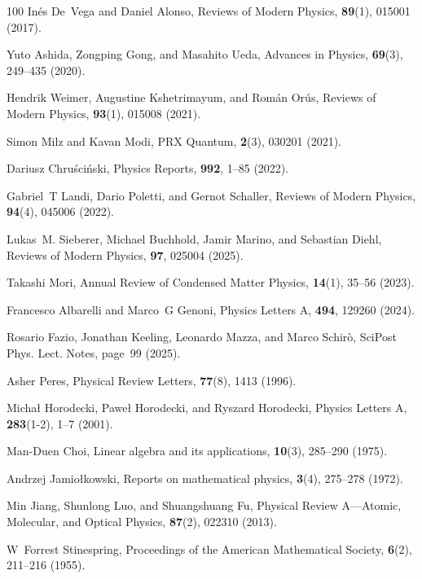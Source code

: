 \documentclass[preprint,pteplogo]{ptephy_v2}%
\numberwithin{equation}{section}
\theoremstyle{definition}
\begin{document}
\begin{thebibliography}{100}
In{\'e}s De~Vega and Daniel Alonso, Reviews of Modern Physics, {\bf 89}(1), 015001 (2017).

Yuto Ashida, Zongping Gong, and Masahito Ueda, Advances in Physics, {\bf 69}(3), 249--435 (2020).

Hendrik Weimer, Augustine Kshetrimayum, and Rom{\'a}n Or{\'u}s, Reviews of Modern Physics, {\bf 93}(1), 015008 (2021).

Simon Milz and Kavan Modi, PRX Quantum, {\bf 2}(3), 030201 (2021).

Dariusz Chru{\'s}ci{\'n}ski, Physics Reports, {\bf 992}, 1--85 (2022).

Gabriel~T Landi, Dario Poletti, and Gernot Schaller, Reviews of Modern Physics, {\bf 94}(4), 045006 (2022).

Lukas~M. Sieberer, Michael Buchhold, Jamir Marino, and Sebastian Diehl, Reviews of Modern Physics, {\bf 97}, 025004 (2025).

Takashi Mori, Annual Review of Condensed Matter Physics, {\bf 14}(1), 35--56 (2023).

Francesco Albarelli and Marco~G Genoni, Physics Letters A, {\bf 494}, 129260 (2024).

Rosario Fazio, Jonathan Keeling, Leonardo Mazza, and Marco Schirò, SciPost Phys. Lect. Notes, page~99 (2025).

Asher Peres, Physical Review Letters, {\bf 77}(8), 1413 (1996).

Micha{\l} Horodecki, Pawe{\l} Horodecki, and Ryszard Horodecki, Physics Letters A, {\bf 283}(1-2), 1--7 (2001).

Man-Duen Choi, Linear algebra and its applications, {\bf 10}(3), 285--290 (1975).

Andrzej Jamio{\l}kowski, Reports on mathematical physics, {\bf 3}(4), 275--278 (1972).

Min Jiang, Shunlong Luo, and Shuangshuang Fu, Physical Review A—Atomic, Molecular, and Optical Physics, {\bf 87}(2), 022310 (2013).

W~Forrest Stinespring, Proceedings of the American Mathematical Society, {\bf 6}(2), 211--216 (1955).


\end{thebibliography}
\end{document}
